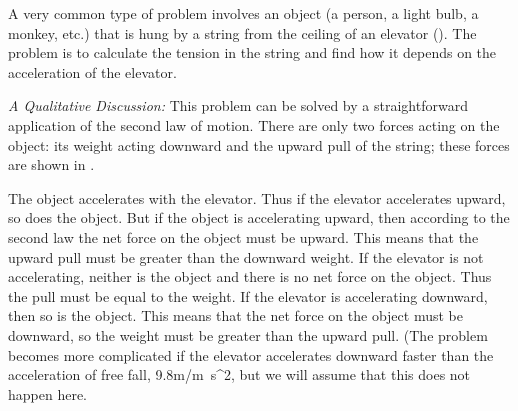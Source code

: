 {
A very common type of problem involves an object (a person, a light bulb, a
monkey, etc.) that is hung by a string from the ceiling of an elevator
().
The problem is to calculate the tension in the string and find how it depends
on the acceleration of the elevator.


\noindent\textit{A Qualitative Discussion:}\newline
This problem can be solved by a straightforward application of the second
law of motion.
There are only two forces acting on the object: its weight acting downward
and the upward pull of the string; these forces are shown in .

The object accelerates with the elevator.
Thus if the elevator accelerates upward, so does the object.
But if the object is accelerating upward, then according to the second law
the net force on the object must be upward.
This means that the upward pull must be greater than the downward weight.
%
%
If the elevator is not accelerating, neither is the object and there is no
net force on the object.
Thus the pull must be equal to the weight.
%
%
If the elevator is accelerating downward, then so is the object.
This means that the net force on the object must be downward, so the weight
must be greater than the upward pull.
%
%
(The problem becomes more complicated if the elevator accelerates downward
faster than the acceleration of free fall, 9.8\unit{m/\m{s^2}}, but we will assume that
this does not happen here.


}
